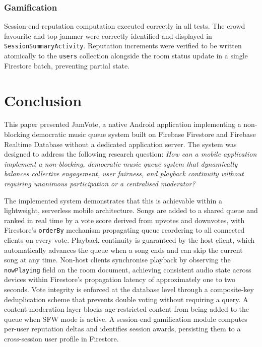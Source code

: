 \documentclass[pdflatex,sn-mathphys-num,iicol]{sn-jnl}
\theoremstyle{thmstyleone}%
\theoremstyle{thmstyletwo}%
\theoremstyle{thmstylethree}%
\begin{document}
\subsubsection{Gamification}

Session-end reputation computation executed correctly in all tests. The crowd
favourite and top jammer were correctly identified and displayed in
\texttt{SessionSummaryActivity}. Reputation increments were verified to be written
atomically to the \texttt{users} collection alongside the room status update in a
single Firestore batch, preventing partial state.

\clearpage
\section{Conclusion}\label{sec:conclusion}

This paper presented JamVote, a native Android application implementing a
non-blocking democratic music queue system built on Firebase Firestore and Firebase
Realtime Database without a dedicated application server. The system was designed to
address the following research question: \textit{How can a mobile application
implement a non-blocking, democratic music queue system that dynamically balances
collective engagement, user fairness, and playback continuity without requiring
unanimous participation or a centralised moderator?}

The implemented system demonstrates that this is achievable within a lightweight,
serverless mobile architecture. Songs are added to a shared queue and ranked in real
time by a vote score derived from upvotes and downvotes, with Firestore's
\texttt{orderBy} mechanism propagating queue reordering to all connected clients on
every vote. Playback continuity is guaranteed by the host client, which automatically
advances the queue when a song ends and can skip the current song at any time.
Non-host clients synchronise playback by observing the \texttt{nowPlaying} field on
the room document, achieving consistent audio state across devices within Firestore's
propagation latency of approximately one to two seconds. Vote integrity is enforced
at the database level through a composite-key deduplication scheme that prevents
double voting without requiring a query. A content moderation layer blocks
age-restricted content from being added to the queue when SFW mode is active. A
session-end gamification module computes per-user reputation deltas and identifies
session awards, persisting them to a cross-session user profile in Firestore.
\end{document}
